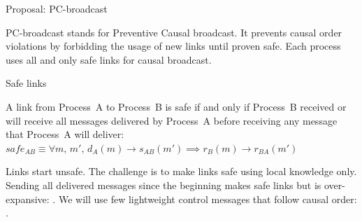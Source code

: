\documentclass[10pt, xcolor={usenames, dvipsnames}]{beamer}
\newcommand{\cmark}{\ding{51}}
\newcommand{\xmark}{\ding{55}}
\newcommand{\YES}[1]{\textcolor{green}{#1}}
\newcommand{\NO}[1]{\textcolor{red}{#1}}
\begin{document}
\begin{frame}{Proposal: PC-broadcast}  

  PC-broadcast stands for Preventive Causal broadcast. It prevents causal order
  violations by forbidding the usage of new links until proven safe. Each
  process uses all and only safe links for causal broadcast.
  
\end{frame}

\begin{frame}{Safe links}

  \begin{definition}
    A link from Process~A to Process~B is safe if and only if Process~B received
    or will receive all messages delivered by Process~A before receiving any
    message that Process~A will deliver:
    $safe_{AB} \equiv \forall m,\, m',\, d_A(m) \rightarrow s_{AB}(m') \implies
    r_B(m) \rightarrow r_{BA}(m')$
  \end{definition}

  \vspace{2em}

  Links start unsafe. The challenge is to make links safe using local knowledge
  only. Sending all delivered messages since the beginning makes safe links but
  is over-expansive: \NO{\xmark}. We will use few lightweight control messages
  that follow causal order: \YES{\cmark}.

\end{frame}
\end{document}
